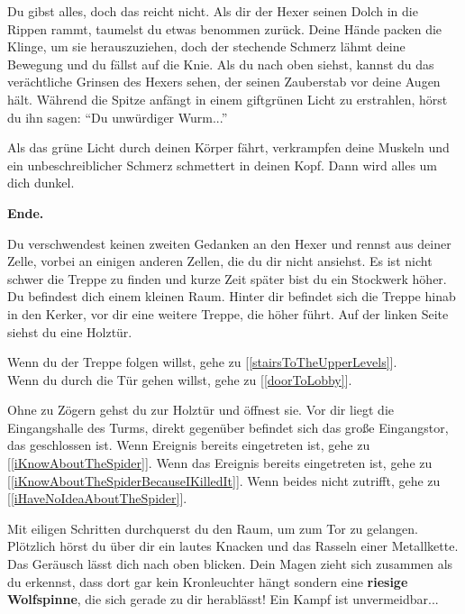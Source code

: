 Du gibst alles, doch das reicht nicht. Als dir der Hexer seinen Dolch in die Rippen rammt, taumelst du etwas benommen zurück. Deine Hände packen die Klinge, um sie herauszuziehen, doch der stechende Schmerz lähmt deine Bewegung und du fällst auf die Knie. Als du nach oben siehst, kannst du das verächtliche Grinsen des Hexers sehen, der seinen Zauberstab vor deine Augen hält. Während die Spitze anfängt in einem giftgrünen Licht zu erstrahlen, hörst du ihn sagen: ``Du unwürdiger Wurm...''

Als das grüne Licht durch deinen Körper fährt, verkrampfen deine Muskeln und ein unbeschreiblicher Schmerz schmettert in deinen Kopf. Dann wird alles um dich dunkel.

\textbf{Ende.}


Du verschwendest keinen zweiten Gedanken an den Hexer und rennst aus deiner Zelle, vorbei an einigen anderen Zellen, die du dir nicht ansiehst. Es ist nicht schwer die Treppe zu finden und kurze Zeit später bist du ein Stockwerk höher. Du befindest dich einem kleinen Raum. Hinter dir befindet sich die Treppe hinab in den Kerker, vor dir eine weitere Treppe, die höher führt. Auf der linken Seite siehst du eine Holztür.

Wenn du der Treppe folgen willst, gehe zu [\ref{stairsToTheUpperLevels}].
\\Wenn du durch die Tür gehen willst, gehe zu [\ref{doorToLobby}].


Ohne zu Zögern gehst du zur Holztür und öffnest sie. Vor dir liegt die Eingangshalle des Turms, direkt gegenüber befindet sich das große Eingangstor, das geschlossen ist. Wenn Ereignis  bereits eingetreten ist, gehe zu [\ref{iKnowAboutTheSpider}]. Wenn das Ereignis  bereits eingetreten ist, gehe zu [\ref{iKnowAboutTheSpiderBecauseIKilledIt}].
Wenn beides nicht zutrifft, gehe zu [\ref{iHaveNoIdeaAboutTheSpider}].


Mit eiligen Schritten durchquerst du den Raum, um zum Tor zu gelangen. Plötzlich hörst du über dir ein lautes Knacken und das Rasseln einer Metallkette.
Das Geräusch lässt dich nach oben blicken. Dein Magen zieht sich zusammen als du erkennst, dass dort gar kein Kronleuchter hängt sondern eine \textbf{riesige Wolfspinne}, die sich gerade zu dir herablässt! Ein Kampf ist unvermeidbar...

